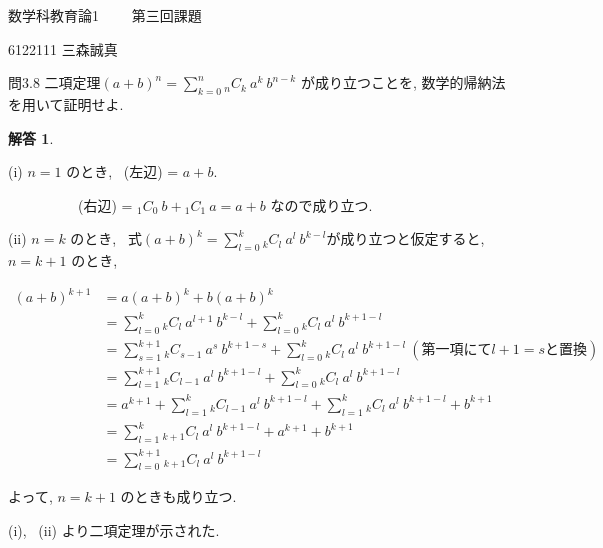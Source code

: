 \documentclass{jsarticle}
\newtheorem*{answer*}{解答}
\begin{document}
\begin{center}
  数学科教育論1 \ \ \ \ 第三回課題
\end{center}

\begin{flushright}
  6122111 三森誠真
\end{flushright}

\begin{itembox}[l]{問3.8}
二項定理$(a+b)^n = \displaystyle \sum_{k=0}^n {}_n C_k \ a^k \ b^{n-k}$ が成り立つことを, 数学的帰納法を用いて証明せよ.
\end{itembox}

\begin{answer*}
\end{answer*}
(i) $n=1$ のとき, \ (左辺) = $a+b$.

\ \ \ \ \ \ \ \ \ \ (右辺) = ${}_1 C_0 \ b + {}_1 C_1 \ a = a+b$
なので成り立つ.

(ii) $n=k$ のとき, \ 式$(a+b)^k = \displaystyle \sum_{l=0}^k {}_k C_l \ a^l \ b^{k-l}$が成り立つと仮定すると, $n=k+1$ のとき,

\begin{align*}
(a+b)^{k+1} 
&= a(a+b)^k + b(a+b)^k \\
&= \displaystyle \sum_{l=0}^k {}_k C_l \ a^{l+1} \ b^{k-l} + \displaystyle \sum_{l=0}^k {}_k C_l \ a^l \ b^{k+1-l} \\
&= \displaystyle \sum_{s=1}^{k+1} {}_k C_{s-1} \ a^s \ b^{k+1-s} + \displaystyle \sum_{l=0}^k {}_k C_l \ a^l \ b^{k+1-l} \ (第一項にてl+1=s と置換)\\
&= \displaystyle \sum_{l=1}^{k+1} {}_k C_{l-1} \ a^l \ b^{k+1-l} + \displaystyle \sum_{l=0}^k {}_k C_l \ a^l \ b^{k+1-l} \\
&= a^{k+1} + \displaystyle \sum_{l=1}^{k} {}_k C_{l-1} \ a^l \ b^{k+1-l} + \displaystyle \sum_{l=1}^k {}_k C_l \ a^l \ b^{k+1-l} + b^{k+1} \\
&= \displaystyle \sum_{l=1}^{k} {}_{k+1} C_l \ a^l \ b^{k+1-l} + a^{k+1} + b^{k+1} \\
&= \displaystyle \sum_{l=0}^{k+1} {}_{k+1} C_l \ a^l \ b^{k+1-l}
\end{align*}

よって, $n=k+1$ のときも成り立つ.

(i), \ (ii) より二項定理が示された.
\end{document}
